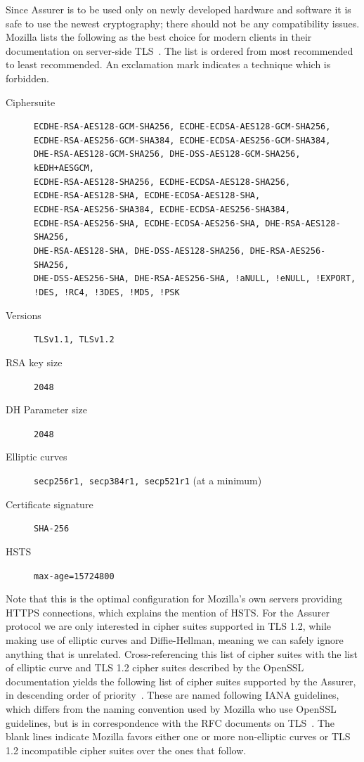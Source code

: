 Since Assurer is to be used only on newly developed hardware and software it is safe to use the newest cryptography; there should not be any compatibility issues. Mozilla lists the following as the best choice for modern clients in their documentation on server-side TLS~\cite{mozilla}. The list is ordered from most recommended to least recommended. An exclamation mark indicates a technique which is forbidden.

\begin{description}
	\item [Ciphersuite] \texttt{ECDHE-RSA-AES128-GCM-SHA256, ECDHE-ECDSA-AES128-GCM-SHA256, \\
ECDHE-RSA-AES256-GCM-SHA384, ECDHE-ECDSA-AES256-GCM-SHA384, \\
DHE-RSA-AES128-GCM-SHA256, DHE-DSS-AES128-GCM-SHA256, kEDH+AESGCM, \\
ECDHE-RSA-AES128-SHA256, ECDHE-ECDSA-AES128-SHA256, \\
ECDHE-RSA-AES128-SHA, ECDHE-ECDSA-AES128-SHA, \\
ECDHE-RSA-AES256-SHA384, ECDHE-ECDSA-AES256-SHA384, \\
ECDHE-RSA-AES256-SHA, ECDHE-ECDSA-AES256-SHA, DHE-RSA-AES128-SHA256, \\
DHE-RSA-AES128-SHA, DHE-DSS-AES128-SHA256, DHE-RSA-AES256-SHA256, \\
DHE-DSS-AES256-SHA, DHE-RSA-AES256-SHA, !aNULL, !eNULL, !EXPORT, \\
!DES, !RC4, !3DES, !MD5, !PSK}
  \item [Versions] \texttt{TLSv1.1, TLSv1.2}
  \item [RSA key size] \texttt{2048}
  \item [DH Parameter size] \texttt{2048}
  \item [Elliptic curves] \texttt{secp256r1, secp384r1, secp521r1} (at a minimum)
  \item [Certificate signature] \texttt{SHA-256}
  \item [HSTS] \texttt{max-age=15724800}
\end{description}

Note that this is the optimal configuration for Mozilla's own servers providing HTTPS connections, which explains the mention of HSTS. For the Assurer protocol we are only interested in cipher suites supported in TLS 1.2, while making use of elliptic curves and Diffie-Hellman, meaning we can safely ignore anything that is unrelated. Cross-referencing this list of cipher suites with the list of elliptic curve and TLS 1.2 cipher suites described by the OpenSSL documentation yields the following list of cipher suites supported by the Assurer, in descending order of priority~\cite{openssl}. These are named following IANA guidelines, which differs from the naming convention used by Mozilla who use OpenSSL guidelines, but is in correspondence with the RFC documents on TLS~\cite{tlsparams}. The blank lines indicate Mozilla favors either one or more non-elliptic curves or TLS 1.2 incompatible cipher suites over the ones that follow. 


